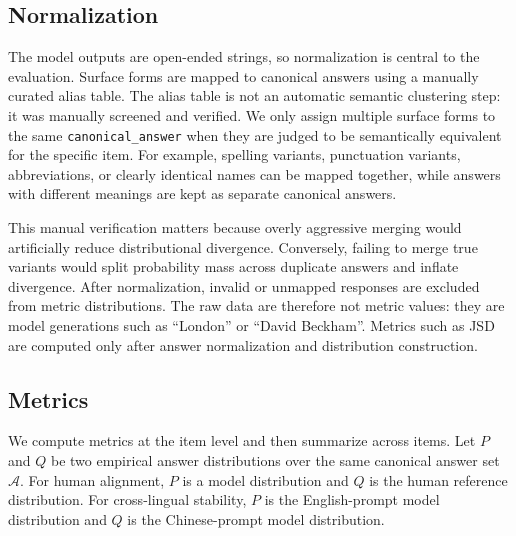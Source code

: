 \documentclass[11pt]{article}
\begin{document}
\subsection{Normalization}

The model outputs are open-ended strings, so normalization is central to the evaluation. Surface forms are mapped to canonical answers using a manually curated alias table. The alias table is not an automatic semantic clustering step: it was manually screened and verified. We only assign multiple surface forms to the same \texttt{canonical\_answer} when they are judged to be semantically equivalent for the specific item. For example, spelling variants, punctuation variants, abbreviations, or clearly identical names can be mapped together, while answers with different meanings are kept as separate canonical answers.

This manual verification matters because overly aggressive merging would artificially reduce distributional divergence. Conversely, failing to merge true variants would split probability mass across duplicate answers and inflate divergence. After normalization, invalid or unmapped responses are excluded from metric distributions. The raw data are therefore not metric values: they are model generations such as ``London'' or ``David Beckham''. Metrics such as JSD are computed only after answer normalization and distribution construction.

\subsection{Metrics}

We compute metrics at the item level and then summarize across items. Let $P$ and $Q$ be two empirical answer distributions over the same canonical answer set $\mathcal{A}$. For human alignment, $P$ is a model distribution and $Q$ is the human reference distribution. For cross-lingual stability, $P$ is the English-prompt model distribution and $Q$ is the Chinese-prompt model distribution.
\end{document}
